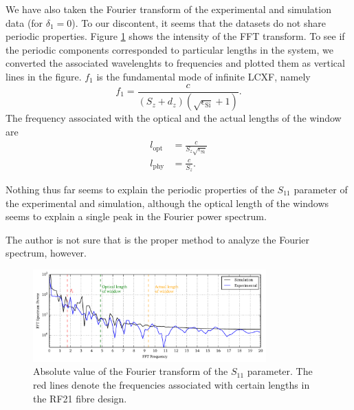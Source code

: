 We have also taken the Fourier transform of the experimental
and simulation data (for $\delta_1=0$). To our discontent, 
it seems that the datasets do not share periodic properties. 
Figure \ref{fig:antenna.fourierAnalysis} shows the intensity
of the FFT transform. To see if the periodic components corresponded
to particular lengths in the system, we converted the associated
wavelenghts to frequencies and plotted them as vertical lines in the figure. 
$f_1$ is the fundamental mode of infinite LCXF, namely
  \begin{equation}
   f_1 = \frac{c}{\left(S_z+d_z\right)\left(\sqrt{\epsilon_\text{Si}}+1\right)}.
  \end{equation}
The frequency associated with the optical and the actual lengths of the window
are
  \begin{align*}
   l_\text{opt}	&= \frac{c}{S_z\sqrt{\epsilon_\text{Si}}}	\\
   l_\text{phy}	&= \frac{c}{S_z}.
  \end{align*}

Nothing thus far seems to explain the periodic properties of the 
$S_{11}$ parameter of the experimental and simulation, although
the optical length of the windows seems to explain a single 
peak in the Fourier power spectrum. 

The author is not sure that is the proper method to
analyze the Fourier spectrum, however.

\begin{figure}
 \centering
 \includegraphics[width=0.8\textwidth]{figs/active/fourierAnalysisS11.pdf}
 \caption[Fourier Power Spectrum]
	  {Absolute value of the Fourier transform of the $S_{11}$ parameter.
	  The red lines denote the frequencies associated with certain lengths
	  in the RF21 fibre design.}
 \label{fig:antenna.fourierAnalysis}
\end{figure}



